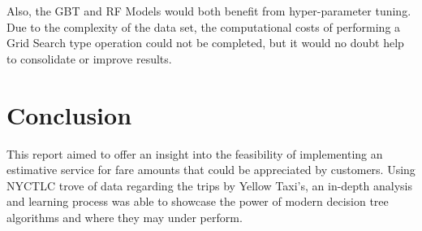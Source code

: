 \documentclass[11pt]{article}
\begin{document}
Also, the GBT and RF Models would both benefit from hyper-parameter tuning. Due to the complexity of the data set, the computational costs of performing a Grid Search type operation could not be completed, but it would no doubt help to consolidate or improve results.

\section{Conclusion}
This report aimed to offer an insight into the feasibility of implementing an estimative service for fare amounts that could be appreciated by customers. Using NYCTLC trove of data regarding the trips by Yellow Taxi's, an in-depth analysis and learning process was able to showcase the power of modern decision tree algorithms and where they may under perform.


\clearpage

\printbibliography
\end{document}
